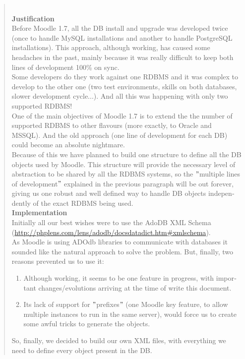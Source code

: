 \documentclass[a4paper]{report}  %
\begin{document}
\begin{otherlanguage}{english}
\begin{quote}
\begin{minipage}{2.51cm}
\end{minipage}
\\
{\bfseries Justification}\\
Before Moodle 1.7, all the DB install and upgrade was developed twice (once to handle MySQL installations and another to handle PostgreSQL installations). This approach, although working, has caused some headaches in the past, mainly because it was really difficult to keep both lines of development 100\% on sync.\\
Some developers do they work against one RDBMS and it was complex to develop to the other one (two test environments, skills on both databases, slower development cycle...). And all this was happening with only two supported RDBMS!\\
One of the main objectives of Moodle 1.7 is to extend the the number of supported RDBMS to other flavours (more exactly, to Oracle and MSSQL). And the old approach (one line of development for each DB) could become an absolute nightmare.\\
Because of this we have planned to build one structure to define all the DB objects used by Moodle. This structure will provide the necessary level of abstraction to be shared by all the RDBMS systems, so the $"$multiple lines of development$"$ explained in the previous paragraph will be out forever, giving us one robust and well defined way to handle DB objects independently of the exact RDBMS being used.\\
{\bfseries Implementation}\\
Initially all our best wishes were to use the AdoDB XML Schema (\url{http://phplens.com/lens/adodb/docsdatadict.htm\#xmlschema}).\\
As Moodle is using ADOdb libraries to communicate with databases it sounded like the natural approach to solve the problem. But, finally, two reasons prevented us to use it:
\begin{enumerate}
\item Although working, it seems to be one feature in progress, with important changes/evolutions arriving at the time of write this document.
\item Its lack of support for $"$prefixes$"$ (one Moodle key feature, to allow multiple instances to run in the same server), would force us to create some awful tricks to generate the objects.
\end{enumerate}
So, finally, we decided to build our own XML files, with everything we need to define every object present in the DB.\\

\end{quote}
\end{otherlanguage}
\end{document}
